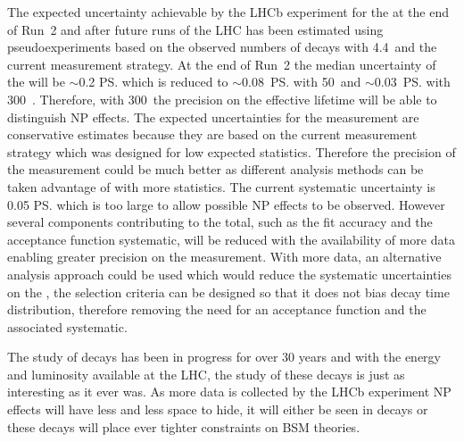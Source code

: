 The expected uncertainty achievable by the LHCb experiment for the \el at the end of Run~2 and after future runs of the LHC has been estimated using pseudoexperiments based on the observed numbers of decays with 4.4~\fb and the current measurement strategy. At the end of Run~2 the median uncertainty of the \el will be $\sim$0.2 \ps which is reduced to $\sim$0.08~\ps with 50~\fb and $\sim$0.03~\ps with 300~\fb. Therefore, with 300~\fb the precision on the effective lifetime will be able to distinguish NP effects. The expected uncertainties for the \el measurement are conservative estimates because they are based on the current measurement strategy which was designed for low expected statistics. Therefore the precision of the measurement could be much better as different analysis methods can be taken advantage of with more statistics. 
The current systematic uncertainty is 0.05 \ps which is too large to allow possible NP effects to be observed. However several components contributing to the total, such as the fit accuracy and the acceptance function systematic, will be reduced with the availability of more data enabling greater precision on the measurement. With more data, an alternative analysis approach could be used which would reduce the systematic uncertainties on the \el, the selection criteria can be designed so that it does not bias \bsmumu decay time distribution, therefore removing the need for an acceptance function and the associated systematic.


The study of \bmumu decays has been in progress for over 30 years and with the energy and luminosity available at the LHC, the study of these decays is just as interesting as it ever was. As more data is collected by the LHCb experiment NP effects will have less and less space to hide, it will either be seen in \bmumu decays or these decays will place ever tighter constraints on BSM theories. 
